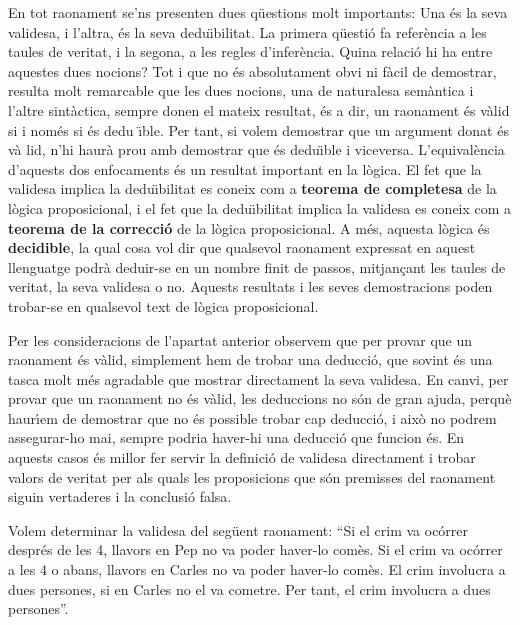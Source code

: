 En tot raonament se'ns presenten dues q\"{u}estions molt importants: Una
\'{e}s la seva validesa, i l'altra, \'{e}s la seva dedu\"{\i}bilitat. La
primera q\"{u}esti\'{o} fa refer\`{e}ncia a les taules de veritat, i la
segona, a les regles d'infer\`{e}ncia. Quina relaci\'{o} hi ha entre
aquestes dues nocions? Tot i que no \'{e}s absolutament obvi ni f\`{a}cil de
demostrar, resulta molt remarcable que les dues nocions, una de naturalesa
sem\`{a}ntica i l'altre sint\`{a}ctica, sempre donen el mateix resultat,
\'{e}s a dir, un raonament \'{e}s v\`{a}lid si i nom\'{e}s si \'{e}s dedu%
\"{\i}ble. Per tant, si volem demostrar que un argument donat \'{e}s v\`{a}%
lid, n'hi haur\`{a} prou amb demostrar que \'{e}s dedu\"{\i}ble i viceversa.
L'equival\`{e}ncia d'aquests dos enfocaments \'{e}s un resultat important en
la l\`{o}gica. El fet que la validesa implica la dedu\"{\i}bilitat es coneix
com a \textbf{teorema de completesa} de la l\`{o}gica proposicional, i el
fet que la dedu\"{\i}bilitat implica la validesa es coneix com a \textbf{%
teorema de la correcci\'{o}} de la l\`{o}gica proposicional. A m\'{e}s,
aquesta l\`{o}gica \'{e}s \textbf{decidible}, la qual cosa vol dir que
qualsevol raonament expressat en aquest llenguatge podr\`{a} deduir-se en un
nombre finit de passos, mitjan\c{c}ant les taules de veritat, la seva
validesa o no. Aquests resultats i les seves demostracions poden trobar-se
en qualsevol text de l\`{o}gica proposicional.

\bigskip

Per les consideracions de l'apartat anterior observem que per provar que un
raonament \'{e}s v\`{a}lid, simplement hem de trobar una deducci\'{o}, que
sovint \'{e}s una tasca molt m\'{e}s agradable que mostrar directament la
seva validesa. En canvi, per provar que un raonament no \'{e}s v\`{a}lid,
les deduccions no s\'{o}n de gran ajuda, perqu\`{e} haur\'{\i}em de
demostrar que no \'{e}s possible trobar cap deducci\'{o}, i aix\`{o} no
podrem assegurar-ho mai, sempre podria haver-hi una deducci\'{o} que funcion%
\'{e}s. En aquests casos \'{e}s millor fer servir la definici\'{o} de
validesa directament i trobar valors de veritat per als quals les
proposicions que s\'{o}n premisses del raonament siguin vertaderes i la
conclusi\'{o} falsa.

\begin{exemple}
Volem determinar la validesa del seg\"{u}ent raonament: \textquotedblleft Si
el crim va oc\'{o}rrer despr\'{e}s de les 4, llavors en Pep no va poder
haver-lo com\`{e}s. Si el crim va oc\'{o}rrer a les 4 o abans, llavors en
Carles no va poder haver-lo com\`{e}s. El crim involucra a dues persones, si
en Carles no el va cometre. Per tant, el crim involucra a dues
persones\textquotedblright.
\end{exemple}

